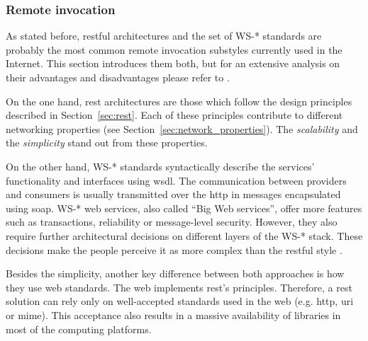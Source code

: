 \subsubsection{Remote invocation}
\label{sec:remote_invocation}


As stated before, \acs{rest}ful architectures and the set of WS-* standards are probably the most common remote invocation substyles currently used in the Internet.
This section introduces them both, but for an extensive analysis on their advantages and disadvantages please refer to \citet{pautasso_restful_2008}.

\bigskip

On the one hand, \ac{rest} architectures are those which follow the design principles described in Section~\ref{sec:rest}.
Each of these principles contribute to different networking properties (see Section~\ref{sec:network_properties}).
The \emph{scalability} and the \emph{simplicity} stand out from these properties.


On the other hand, WS-* standards syntactically describe the services' functionality and interfaces using \ac{wsdl}.
The communication between providers and consumers is usually transmitted over the \ac{http} in messages encapsulated using \ac{soap}.
WS-* web services, also called ``Big Web services'', offer more features such as transactions, reliability or message-level security.
However, they also require further architectural decisions on different layers of the WS-* stack.
These decisions make the people perceive it as more complex than the \ac{rest}ful style \citep{guinard_search_2011}.


\bigskip

Besides the simplicity, another key difference between both approaches is how they use web standards. %
The web implements \ac{rest}'s principles.
Therefore, a \ac{rest} solution can rely only on well-accepted standards used in the web (e.g. \acs{http}, \acs{uri} or \acs{mime}).
This acceptance also results in a massive availability of libraries in most of the computing platforms.


